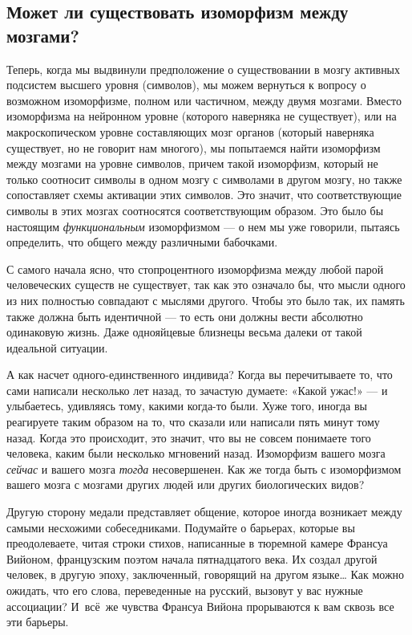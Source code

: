 \documentclass[../main.tex]{subfiles}
\begin{document}

\subsection{Может ли существовать изоморфизм между мозгами?}

Теперь, когда мы выдвинули предположение о существовании в мозгу активных подсистем высшего уровня (символов), мы можем вернуться к вопросу о возможном изоморфизме, полном или частичном, между двумя мозгами. Вместо изоморфизма на нейронном уровне (которого наверняка не существует), или на макроскопическом уровне составляющих мозг органов (который наверняка существует, но не говорит нам многого), мы попытаемся найти изоморфизм между мозгами на уровне символов, причем такой изоморфизм, который не только соотносит символы в одном мозгу с символами в другом мозгу, но также сопоставляет схемы активации этих символов. Это значит, что соответствующие символы в этих мозгах соотносятся соответствующим образом. Это было бы настоящим \emph{функциональным} изоморфизмом --- о нем мы уже говорили, пытаясь определить, что общего между различными бабочками.

С самого начала ясно, что стопроцентного изоморфизма между любой парой человеческих существ не существует, так как это означало бы, что мысли одного из них полностью совпадают с мыслями другого. Чтобы это было так, их память также должна быть идентичной --- то есть они должны вести абсолютно одинаковую жизнь. Даже однояйцевые близнецы весьма далеки от такой идеальной ситуации.

А как насчет одного-единственного индивида? Когда вы перечитываете то, что сами написали несколько лет назад, то зачастую думаете: «Какой ужас!» --- и улыбаетесь, удивляясь тому, какими когда-то были. Хуже того, иногда вы реагируете таким образом на то, что сказали или написали пять минут тому назад. Когда это происходит, это значит, что вы не совсем понимаете того человека, каким были несколько мгновений назад. Изоморфизм вашего мозга \emph{сейчас} и вашего мозга \emph{тогда} несовершенен. Как же тогда быть с изоморфизмом вашего мозга с мозгами других людей или других биологических видов?

Другую сторону медали представляет общение, которое иногда возникает между самыми несхожими собеседниками. Подумайте о барьерах, которые вы преодолеваете, читая строки стихов, написанные в тюремной камере Франсуа Вийоном, французским поэтом начала пятнадцатого века. Их создал другой человек, в другую эпоху, заключенный, говорящий на другом языке\ldots{} Как можно ожидать, что его слова, переведенные на русский, вызовут у вас нужные ассоциации? И~всё~же чувства Франсуа Вийона прорываются к вам сквозь все эти барьеры.
\end{document}
